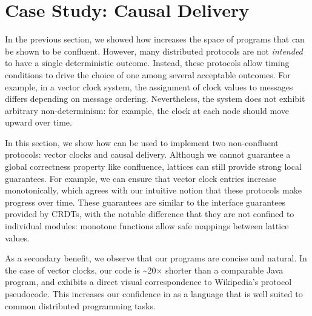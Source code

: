 \section{Case Study: Causal Delivery}
\label{sec:causal}

In the previous section, we showed how \lang increases the space of programs
that can be shown to be confluent. However, many distributed protocols are not
\emph{intended} to have a single deterministic outcome. Instead, these protocols allow timing conditions to drive the
choice of one among several acceptable outcomes. For example, in a vector clock
system, the assignment of clock values to messages differs depending on
message ordering. Nevertheless, the system does not exhibit arbitrary
non-determinism: for example, the clock at each node should move upward over time.

In this section, we show how \lang can be used to implement two non-confluent
protocols: vector clocks and causal delivery. Although we cannot guarantee a
global correctness property like confluence, lattices can still provide strong local
guarantees. For example, we can ensure that vector clock entries increase monotonically,
which agrees with our intuitive notion that these protocols make progress over
time. These guarantees are similar to the interface guarantees provided by
CRDTs, with the notable difference that they are not confined to individual modules: monotone functions allow safe mappings
between lattice values.

As a secondary benefit, we observe that our programs are concise and natural.  In the case of vector clocks,
our code is \textasciitilde{}20$\times$ shorter than a comparable Java program, and exhibits a
direct visual correspondence to Wikipedia's protocol pseudocode. This
increases our confidence in \lang as a language that is well suited to common distributed programming tasks.


